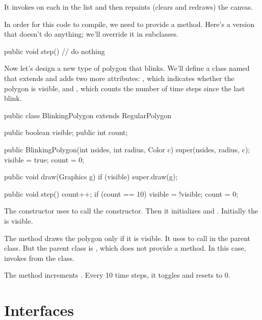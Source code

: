 It invokes  on each  in the list and then repaints (clears and redraws) the canvas.

In order for this code to compile, we need  to provide a  method.
Here's a version that doesn't do anything; we'll override it in subclasses.

\begin{code}
public void step() {
    // do nothing
}
\end{code}

Now let's design a new type of polygon that blinks.
We'll define a class named  that extends  and adds two more attributes: , which indicates whether the polygon is visible, and , which counts the number of time steps since the last blink.

\begin{code}
public class BlinkingPolygon extends RegularPolygon {
    public boolean visible;
    public int count;

    public BlinkingPolygon(int nsides, int radius, Color c) {
        super(nsides, radius, c);
        visible = true;
        count = 0;
    }

    public void draw(Graphics g) {
        if (visible) {
            super.draw(g);
        }
    }

    public void step() {
        count++;
        if (count == 10) {
            visible = !visible;
            count = 0;
        }
    }
}
\end{code}

The constructor uses  to call the  constructor.
Then it initializes  and .
Initially the  is visible.

The  method draws the polygon only if it is visible.
It uses  to call  in the parent class.
But the parent class is , which does not provide a  method.
In this case,  invokes  from the  class.

The  method increments .
Every 10 time steps, it toggles  and resets  to 0.


\section{Interfaces}

